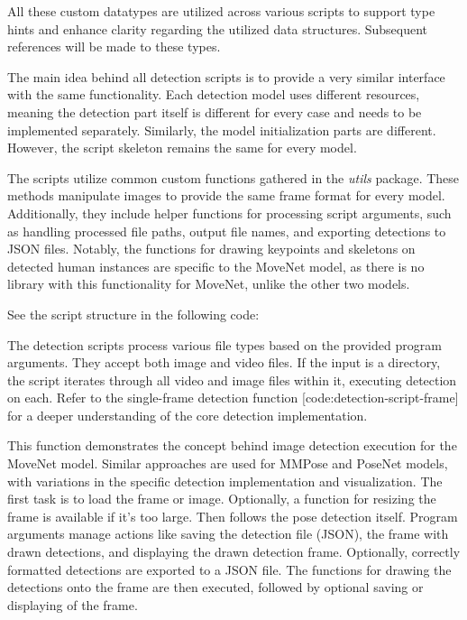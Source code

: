 All these custom datatypes are utilized across various scripts to support type hints and enhance clarity regarding the utilized data structures. Subsequent references will be made to these types.

The main idea behind all detection scripts is to provide a very similar interface with the same functionality. Each detection model uses different resources, meaning the detection part itself is different for every case and needs to be implemented separately. Similarly, the model initialization parts are different. However, the script skeleton remains the same for every model.

The scripts utilize common custom functions gathered in the {\em utils} package. These methods manipulate images to provide the same frame format for every model. Additionally, they include helper functions for processing script arguments, such as handling processed file paths, output file names, and exporting detections to JSON files. Notably, the functions for drawing keypoints and skeletons on detected human instances are specific to the MoveNet model, as there is no library with this functionality for MoveNet, unlike the other two models.

See the script structure in the following code:


The detection scripts process various file types based on the provided program arguments. They accept both image and video files. If the input is a directory, the script iterates through all video and image files within it, executing detection on each. Refer to the single-frame detection function [code:detection-script-frame] for a deeper understanding of the core detection implementation.


This function demonstrates the concept behind image detection execution for the MoveNet model. Similar approaches are used for MMPose and PoseNet models, with variations in the specific detection implementation and visualization. The first task is to load the frame or image. Optionally, a function for resizing the frame is available if it's too large. Then follows the pose detection itself. Program arguments manage actions like saving the detection file (JSON), the frame with drawn detections, and displaying the drawn detection frame. Optionally, correctly formatted detections are exported to a JSON file. The functions for drawing the detections onto the frame are then executed, followed by optional saving or displaying of the frame.

